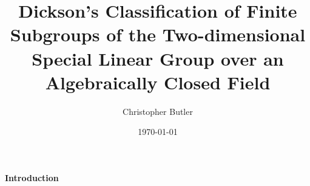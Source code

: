 \documentclass[a4paper , 11pt]{book}
\theoremstyle{definition}
\theoremstyle{remark}
\begin{document}
\frontmatter
\title{Dickson's Classification of Finite Subgroups of the Two-dimensional Special Linear Group over an Algebraically Closed Field}
\author{Christopher Butler}
\date{\today}
\maketitle

\cleardoublepage


\tableofcontents

\newpage\phantom{blabla}
\thispagestyle{plain}
\mainmatter

\setcounter{chapter}{-1}

\newpage
\thispagestyle{plain}
\begin{center}
       \Large \textbf{Introduction}
\end{center}
\end{document}
